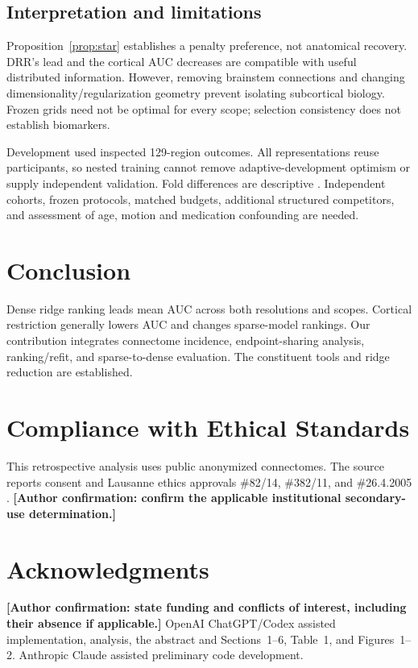 \documentclass{article}
\newcommand{\AuthorConfirmation}[1]{\textbf{[Author confirmation: #1]}}
\begin{document}
\subsection{Interpretation and limitations}
Proposition~\ref{prop:star} establishes a penalty preference, not anatomical recovery. DRR's lead and the cortical AUC decreases are compatible with useful distributed information. However, removing brainstem connections and changing dimensionality/regularization geometry prevent isolating subcortical biology. Frozen grids need not be optimal for every scope; selection consistency does not establish biomarkers.

Development used inspected 129-region outcomes. All representations reuse participants, so nested training cannot remove adaptive-development optimism or supply independent validation. Fold differences are descriptive \cite{varoquaux}. Independent cohorts, frozen protocols, matched budgets, additional structured competitors, and assessment of age, motion and medication confounding are needed.

\section{Conclusion}
Dense ridge ranking leads mean AUC across both resolutions and scopes. Cortical restriction generally lowers AUC and changes sparse-model rankings. Our contribution integrates connectome incidence, endpoint-sharing analysis, ranking/refit, and sparse-to-dense evaluation. The constituent tools and ridge reduction are established.

\section{Compliance with Ethical Standards}
This retrospective analysis uses public anonymized connectomes. The source reports consent and Lausanne ethics approvals \#82/14, \#382/11, and \#26.4.2005 \cite{data}. \AuthorConfirmation{confirm the applicable institutional secondary-use determination.}

\section{Acknowledgments}
\AuthorConfirmation{state funding and conflicts of interest, including their absence if applicable.}
OpenAI ChatGPT/Codex assisted implementation, analysis, the abstract and Sections~1--6, Table~1, and Figures~1--2. Anthropic Claude assisted preliminary code development.
\end{document}

